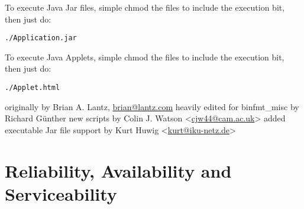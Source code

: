 \documentclass[a4paper,8pt,english]{sphinxmanual}
\begin{document}
To execute Java Jar files, simple chmod the  files to include
the execution bit, then just do:

\begin{Verbatim}[commandchars=\\\{\}]
./Application.jar
\end{Verbatim}

To execute Java Applets, simple chmod the  files to include
the execution bit, then just do:

\begin{Verbatim}[commandchars=\\\{\}]
./Applet.html
\end{Verbatim}

originally by Brian A. Lantz, \href{mailto:brian@lantz.com}{brian@lantz.com}
heavily edited for binfmt\_misc by Richard Günther
new scripts by Colin J. Watson \textless{}\href{mailto:cjw44@cam.ac.uk}{cjw44@cam.ac.uk}\textgreater{}
added executable Jar file support by Kurt Huwig \textless{}\href{mailto:kurt@iku-netz.de}{kurt@iku-netz.de}\textgreater{}


\chapter{Reliability, Availability and Serviceability}
\label{admin-guide/ras:reliability-availability-and-serviceability}\label{admin-guide/ras::doc}
\end{document}
